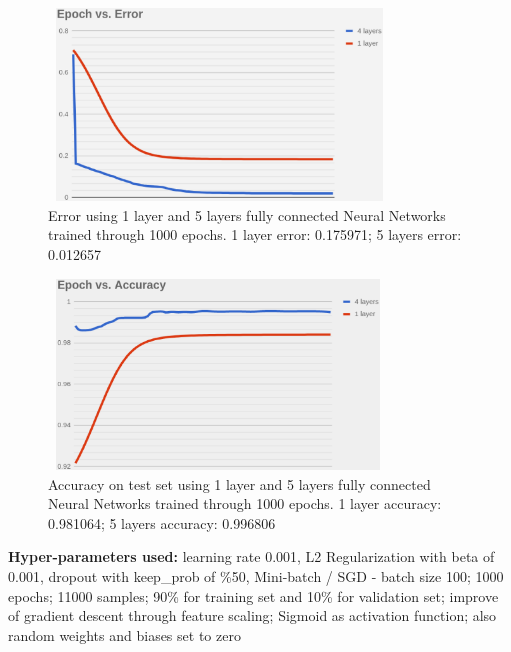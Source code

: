 \documentclass{llncs}       %
\begin{document}
\begin{figure}[h]
\centering
\includegraphics[width=9.08cm,height=5.11cm]{media/image10.eps}
\caption{ Error using 1 layer and 5 layers fully connected Neural Networks trained through 1000 epochs. 1 layer error:  0.175971;  5 layers error:  0.012657}
\end{figure}


\begin{figure}[h]
\centering
\includegraphics[width=9.00cm,height=5.07cm]{media/image11.eps}
\caption{Accuracy on test set using 1 layer and 5 layers fully 
connected Neural Networks trained through 1000 epochs. 1 layer accuracy: 
0.981064; 5 layers accuracy: 0.996806}
\end{figure}


\textbf{Hyper-parameters used: }learning rate 0.001, L2 Regularization with beta of 0.001, dropout with keep\_prob of \%50, Mini-batch / SGD 
- batch size 100; 1000 epochs; 11000 samples; 90\% for training set and 
10\% for validation set; improve of gradient descent through feature 
scaling; Sigmoid as activation function; also random weights and biases 
set to zero

 

\paragraph{}\paragraph{}
\end{document}
